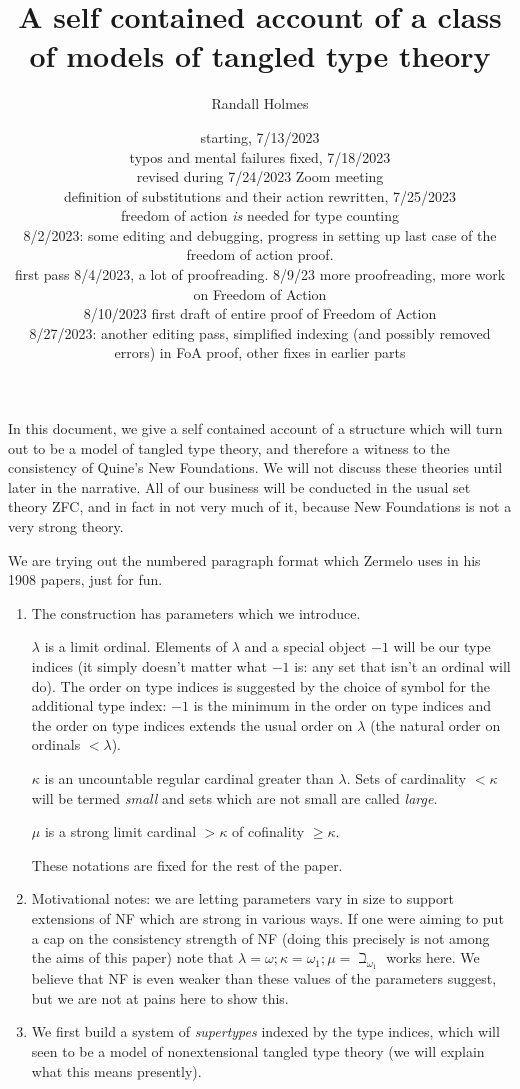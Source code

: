 \documentclass[12pt]{article}
\title{A self contained account of a class of models of tangled type theory}
\author{Randall Holmes}
\date{starting, 7/13/2023\\
typos and mental failures fixed, 7/18/2023\\
revised during 7/24/2023 Zoom meeting\\definition of substitutions and their action rewritten, 7/25/2023\\
freedom of action {\em is} needed for type counting\\
8/2/2023:  some editing and debugging, progress in setting up last case of the freedom of action proof.\\
first pass 8/4/2023, a lot of proofreading.
8/9/23 more proofreading, more work on Freedom of Action\\
8/10/2023 first draft of entire proof of Freedom of Action\\
8/27/2023:  another editing pass, simplified indexing (and possibly removed errors) in FoA proof, other fixes in earlier parts}
\begin{document}
\maketitle

In this document, we give a self contained account of a structure which will turn out to be a model of tangled type theory, and therefore a witness to the consistency of Quine's New Foundations.
We will not discuss these theories until later in the narrative.  All of our business will be conducted in the usual set theory ZFC, and in fact in not very much of it, because New Foundations is not a very strong theory.

We are trying out the numbered paragraph format which Zermelo uses in his 1908 papers, just for fun.

\begin{enumerate}

\item The construction has parameters which we introduce.

$\lambda$ is a limit ordinal.  Elements of $\lambda$ and a special object $-1$ will be our type indices (it simply doesn't matter what $-1$ is:  any set that isn't an ordinal will do).  The order on type indices is suggested by the choice of symbol for the additional type index:  $-1$ is the minimum in the order on type indices and the order on type indices extends the usual order on $\lambda$ (the natural order on ordinals $<\lambda$).

$\kappa$ is an uncountable regular cardinal greater than $\lambda$.  Sets of cardinality $<\kappa$ will be termed {\em small\/} and sets which are not small are called {\em large\/}.

$\mu$ is a strong limit cardinal $>\kappa$ of cofinality $\geq \kappa$.

These notations are fixed for the rest of the paper.

\item  Motivational notes:  we are letting parameters vary in size to support extensions of NF which are strong in various ways.  If one were aiming to put a cap on the consistency strength of NF (doing this precisely is not among the aims of this paper) note that $\lambda = \omega; \kappa = \omega_1; \mu = \beth_{\omega_1}$ works here.  We believe that NF is even weaker than these values of the parameters suggest, but we are not at pains here to show this.

\item We first build a system of {\em supertypes\/} indexed by the type indices, which will seen to be a model of nonextensional tangled type theory (we will explain what this means presently).


\end{enumerate}
\end{document}
